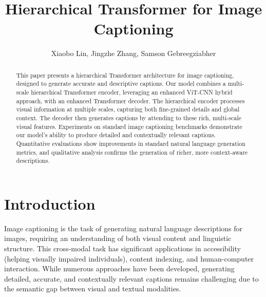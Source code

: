 \documentclass[10pt,twocolumn,letterpaper]{article}
\begin{document}
\title{Hierarchical Transformer for Image Captioning}

\author{Xiaobo Lin, Jingzhe Zhang, Samson Gebreegziabher}

\maketitle

\begin{abstract}
   This paper presents a hierarchical Transformer architecture for image captioning, designed to generate accurate and descriptive captions. Our model combines a multi-scale hierarchical Transformer encoder, leveraging an enhanced ViT-CNN hybrid approach, with an enhanced Transformer decoder. The hierarchical encoder processes visual information at multiple scales, capturing both fine-grained details and global context. The decoder then generates captions by attending to these rich, multi-scale visual features. Experiments on standard image captioning benchmarks demonstrate our model's ability to produce detailed and contextually relevant captions. Quantitative evaluations show improvements in standard natural language generation metrics, and qualitative analysis confirms the generation of richer, more context-aware descriptions.
\end{abstract}

\section{Introduction}

Image captioning is the task of generating natural language descriptions for images, requiring an understanding of both visual content and linguistic structure. This cross-modal task has significant applications in accessibility (helping visually impaired individuals), content indexing, and human-computer interaction. While numerous approaches have been developed, generating detailed, accurate, and contextually relevant captions remains challenging due to the semantic gap between visual and textual modalities.
\end{document}
